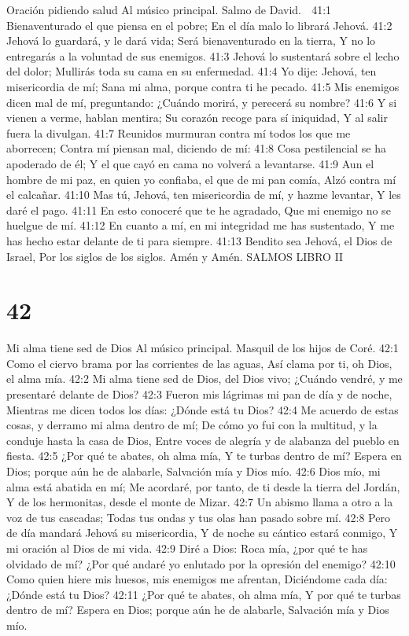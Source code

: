 Oración pidiendo salud 
Al músico principal. Salmo de David. 

41:1 Bienaventurado el que piensa en el pobre; 
En el día malo lo librará Jehová. 
41:2 Jehová lo guardará, y le dará vida; 
Será bienaventurado en la tierra, 
Y no lo entregarás a la voluntad de sus enemigos. 
41:3 Jehová lo sustentará sobre el lecho del dolor; 
Mullirás toda su cama en su enfermedad. 
41:4 Yo dije: Jehová, ten misericordia de mí; 
Sana mi alma, porque contra ti he pecado. 
41:5 Mis enemigos dicen mal de mí, preguntando: 
¿Cuándo morirá, y perecerá su nombre? 
41:6 Y si vienen a verme, hablan mentira; 
Su corazón recoge para sí iniquidad, 
Y al salir fuera la divulgan. 
41:7 Reunidos murmuran contra mí todos los que me aborrecen; 
Contra mí piensan mal, diciendo de mí: 
41:8 Cosa pestilencial se ha apoderado de él; 
Y el que cayó en cama no volverá a levantarse. 
41:9 Aun el hombre de mi paz, en quien yo confiaba, el que de mi pan comía, 
Alzó contra mí el calcañar. 
41:10 Mas tú, Jehová, ten misericordia de mí, y hazme levantar, 
Y les daré el pago. 
41:11 En esto conoceré que te he agradado, 
Que mi enemigo no se huelgue de mí. 
41:12 En cuanto a mí, en mi integridad me has sustentado, 
Y me has hecho estar delante de ti para siempre. 
41:13 Bendito sea Jehová, el Dios de Israel, 
Por los siglos de los siglos. 
Amén y Amén.
SALMOS 
LIBRO II

\chapter{42}

Mi alma tiene sed de Dios 
Al músico principal. Masquil de los hijos de Coré. 
42:1 Como el ciervo brama por las corrientes de las aguas, 
Así clama por ti, oh Dios, el alma mía. 
42:2 Mi alma tiene sed de Dios, del Dios vivo; 
¿Cuándo vendré, y me presentaré delante de Dios? 
42:3 Fueron mis lágrimas mi pan de día y de noche, 
Mientras me dicen todos los días: ¿Dónde está tu Dios? 
42:4 Me acuerdo de estas cosas, y derramo mi alma dentro de mí; 
De cómo yo fui con la multitud, y la conduje hasta la casa de Dios, 
Entre voces de alegría y de alabanza del pueblo en fiesta. 
42:5 ¿Por qué te abates, oh alma mía, 
Y te turbas dentro de mí? 
Espera en Dios; porque aún he de alabarle, 
Salvación mía y Dios mío. 
42:6 Dios mío, mi alma está abatida en mí; 
Me acordaré, por tanto, de ti desde la tierra del Jordán, 
Y de los hermonitas, desde el monte de Mizar. 
42:7 Un abismo llama a otro a la voz de tus cascadas; 
Todas tus ondas y tus olas han pasado sobre mí. 
42:8 Pero de día mandará Jehová su misericordia, 
Y de noche su cántico estará conmigo, 
Y mi oración al Dios de mi vida. 
42:9 Diré a Dios: Roca mía, ¿por qué te has olvidado de mí? 
¿Por qué andaré yo enlutado por la opresión del enemigo? 
42:10 Como quien hiere mis huesos, mis enemigos me afrentan, 
Diciéndome cada día: ¿Dónde está tu Dios? 
42:11 ¿Por qué te abates, oh alma mía, 
Y por qué te turbas dentro de mí? 
Espera en Dios; porque aún he de alabarle, 
Salvación mía y Dios mío. 

